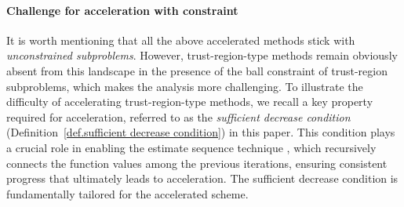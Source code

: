\documentclass{article}
\begin{document}
\paragraph{Challenge for acceleration with constraint}
It is worth mentioning that all the above accelerated methods stick with \emph{unconstrained subproblems}.
However, trust-region-type methods remain obviously absent from this landscape in the presence of the ball constraint of trust-region subproblems, which makes the analysis more challenging. To illustrate the difficulty of accelerating trust-region-type methods, we recall a key property required for acceleration, referred to as the \emph{sufficient decrease condition} (Definition~\ref{def.sufficient decrease condition}) in this paper. This condition plays a crucial role in enabling the estimate sequence technique \cite{baesEstimateSequenceMethods2009a,nesterov_lectures_2018}, which recursively connects the function values among the previous iterations, ensuring consistent progress that ultimately leads to acceleration. The sufficient decrease condition is fundamentally tailored for the accelerated scheme.






\end{document}
